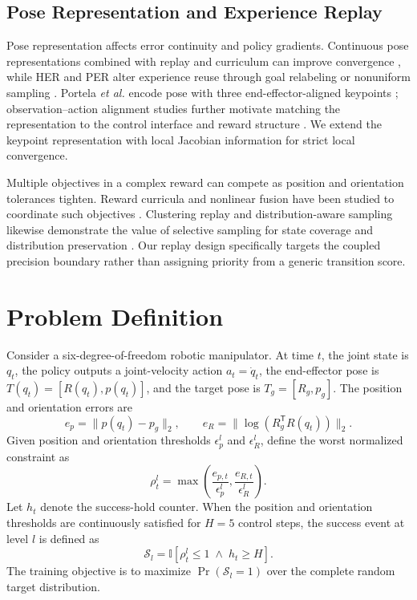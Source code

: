 \documentclass[conference]{IEEEtran}
\begin{document}
\subsection{Pose Representation and Experience Replay}
Pose representation affects error continuity and policy gradients. Continuous pose representations combined with replay and curriculum can improve convergence \cite{hu2025rtpc}, while HER and PER alter experience reuse through goal relabeling or nonuniform sampling \cite{andrychowicz2017her,schaul2016sac}. Portela \emph{et al.} encode pose with three end-effector-aligned keypoints \cite{portela2025wholebody}; observation--action alignment studies further motivate matching the representation to the control interface and reward structure \cite{bhat2026alignment}. We extend the keypoint representation with local Jacobian information for strict local convergence.

Multiple objectives in a complex reward can compete as position and orientation tolerances tighten. Reward curricula and nonlinear fusion have been studied to coordinate such objectives \cite{freitag2025complexreward,jiang2025rfm}. Clustering replay and distribution-aware sampling likewise demonstrate the value of selective sampling for state coverage and distribution preservation \cite{li2022clusteringreplay,garg2026distributionreplay}. Our replay design specifically targets the coupled precision boundary rather than assigning priority from a generic transition score.

\section{Problem Definition}
Consider a six-degree-of-freedom robotic manipulator. At time $t$, the joint state is $q_t$, the policy outputs a joint-velocity action $a_t=\dot q_t$, the end-effector pose is $T(q_t)=[R(q_t),p(q_t)]$, and the target pose is $T_g=[R_g,p_g]$. The position and orientation errors are
\begin{equation}
e_p=\|p(q_t)-p_g\|_2,
\qquad
e_R=\|\log(R_g^{\mathsf T}R(q_t))\|_2 .
\label{eq:pose_error}
\end{equation}
Given position and orientation thresholds $\epsilon_p^l$ and $\epsilon_R^l$, define the worst normalized constraint as
\begin{equation}
\rho_t^l=\max\left(\frac{e_{p,t}}{\epsilon_p^l},\frac{e_{R,t}}{\epsilon_R^l}\right).
\label{eq:rho}
\end{equation}
Let $h_t$ denote the success-hold counter. When the position and orientation thresholds are continuously satisfied for $H=5$ control steps, the success event at level $l$ is defined as
\begin{equation}
\mathcal{S}_l=\mathbb{I}[\rho_t^l\leq1\;\wedge\;h_t\geq H].
\label{eq:success}
\end{equation}
The training objective is to maximize $\Pr(\mathcal{S}_l=1)$ over the complete random target distribution.
\end{document}
